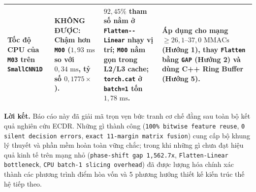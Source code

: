 \documentclass[11pt,a4paper]{article}
\newcommand{\code}[1]{{\small\ttfamily\nolinkurl{#1}}}
\begin{document}
\begin{table}[!htbp]
\begin{tabularx}{\linewidth}{@{}P{3.0cm}P{4.5cm}P{4.2cm}Y@{}}
\addlinespace[3pt]
\textbf{Tốc độ CPU của \code{M03} trên \code{SmallCNN1D}} & \textcolor{warnred}{\textbf{KHÔNG ĐƯỢC:}} Chậm hơn \code{M00} ($1,93\text{ ms}$ so với $0,34\text{ ms}$, tỷ số $0,1775\times$). & $92,45\%$ tham số nằm ở \code{Flatten--Linear} nhạy vị trí; \code{M00} nằm gọn trong L2/L3 cache; \code{torch.cat} ở \code{batch=1} tốn $1,78\text{ ms}$. & Áp dụng cho mạng $\ge 26,1\text{--}37,0\text{ MMACs}$ (Hướng 1), thay \code{Flatten} bằng \code{GAP} (Hướng 2) và dùng C++ Ring Buffer (Hướng 5). \\
\bottomrule
\end{tabularx}
\end{table}

\textbf{Lời kết.} Báo cáo này đã giải mã trọn vẹn bức tranh cơ chế đằng sau toàn bộ kết quả nghiên cứu ECDR. Những gì thành công (\code{100\% bitwise feature reuse}, \code{0 silent decision errors}, \code{exact 11-margin matrix fusion}) cung cấp bộ khung lý thuyết và phần mềm hoàn toàn vững chắc; trong khi những gì chưa đạt hiệu quả kinh tế trên mạng nhỏ (\code{phase-shift gap 1,562.7x}, \code{Flatten-Linear bottleneck}, \code{CPU batch-1 slicing overhead}) đã được lượng hóa chính xác thành các phương trình điểm hòa vốn và 5 phương hướng thiết kế kiến trúc thế hệ tiếp theo.
\end{document}
